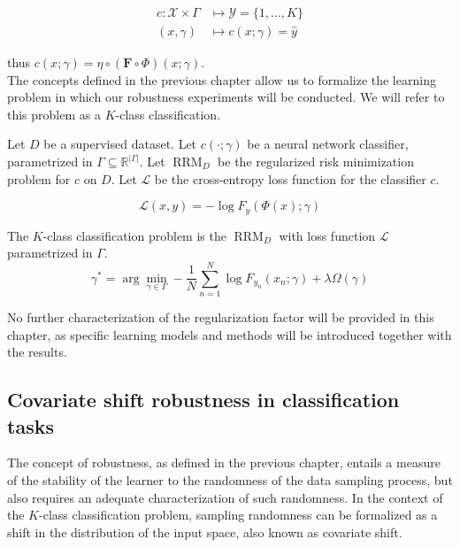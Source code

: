 $$
    \begin{aligned}
    c: \mathcal{X} \times \Gamma & \longmapsto \mathcal{Y} = \{1, \dots, K \} \\
    (x, \gamma) & \longmapsto c(x; \gamma) = \hat{y}
    \end{aligned}
$$

thus $c(x; \gamma) = \eta \circ (\bm{F} \circ \Phi)(x; \gamma)$. \\

The concepts defined in the previous chapter allow us to 
formalize the learning problem in which our robustness experiments
will be conducted. We will refer to this problem as a 
$K$-class classification.

\begin{definition}
    Let $D$ be a supervised dataset.
    Let $c(\cdot; \gamma)$ be a neural network classifier, parametrized
    in $\Gamma \subseteq \mathbb{R}^{|\Gamma|}$.
    Let $\operatorname{RRM}_D$ be the regularized risk minimization problem for $c$ on $D$.
    Let $\mathcal{L}$ be the cross-entropy loss function for the classifier $c$.

    $$
    \mathcal{L}(x, y) = - \log F_y(\Phi(x); \gamma)
    $$

    The $K$-class classification problem is the $\operatorname{RRM}_D$ 
    with loss function $\mathcal{L}$ parametrized in $\Gamma$. 
    $$
        \gamma^* = \arg \min_{\gamma \in \Gamma} - \frac{1}{N}\sum_{n=1}^{N} \log F_{y_n}(x_n; \gamma) + \lambda \Omega(\gamma)
    $$

\end{definition}

No further characterization of the regularization factor will be provided
in this chapter, as specific learning models and methods will be introduced
together with the results.

\subsection{Covariate shift robustness in classification tasks}

The concept of robustness, as defined in the previous chapter, entails
a measure of the stability of the learner to the randomness of
the data sampling process, but also requires an adequate characterization
of such randomness. In the context of the $K$-class classification
problem, sampling randomness can be formalized as a shift in the
distribution of the input space, also known as covariate shift. 

